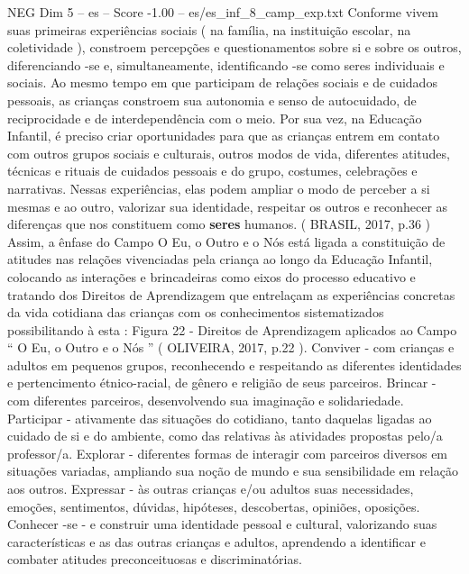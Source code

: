\begin{textsample}{NEG Dim 5 – es – Score -1.00 – es/es\_inf\_8\_camp\_exp.txt}
Conforme vivem suas primeiras experiências sociais ( na família, na instituição escolar, na coletividade ), constroem percepções e questionamentos sobre si e sobre os outros, diferenciando -se e, simultaneamente, identificando -se como seres individuais e sociais.
Ao mesmo tempo em que participam de relações sociais e de cuidados pessoais, as crianças constroem sua autonomia e senso de autocuidado, de reciprocidade e de interdependência com o meio.
Por sua vez, na Educação Infantil, é preciso criar oportunidades para que as crianças entrem em contato com outros grupos sociais e culturais, outros modos de vida, diferentes atitudes, técnicas e rituais de cuidados pessoais e do grupo, costumes, celebrações e narrativas.
Nessas experiências, elas podem ampliar o modo de perceber a si mesmas e ao outro, valorizar sua identidade, respeitar os outros e reconhecer as diferenças que nos constituem como \textbf{seres} humanos. ( BRASIL, 2017, p.36 ) Assim, a ênfase do Campo O Eu, o Outro e o Nós está ligada a constituição de atitudes nas relações vivenciadas pela criança ao longo da Educação Infantil, colocando as interações e brincadeiras como eixos do processo educativo e tratando dos Direitos de Aprendizagem que entrelaçam as experiências concretas da vida cotidiana das crianças com os conhecimentos sistematizados possibilitando à esta : Figura 22 - Direitos de Aprendizagem aplicados ao Campo “ O Eu, o Outro e o Nós ” ( OLIVEIRA, 2017, p.22 ).
Conviver - com crianças e adultos em pequenos grupos, reconhecendo e respeitando as diferentes identidades e pertencimento étnico-racial, de gênero e religião de seus parceiros.
Brincar - com diferentes parceiros, desenvolvendo sua imaginação e solidariedade.
Participar - ativamente das situações do cotidiano, tanto daquelas ligadas ao cuidado de si e do ambiente, como das relativas às atividades propostas pelo/a professor/a.
Explorar - diferentes formas de interagir com parceiros diversos em situações variadas, ampliando sua noção de mundo e sua sensibilidade em relação aos outros.
Expressar - às outras crianças e/ou adultos suas necessidades, emoções, sentimentos, dúvidas, hipóteses, descobertas, opiniões, oposições.
Conhecer -se - e construir uma identidade pessoal e cultural, valorizando suas características e as das outras crianças e adultos, aprendendo a identificar e combater atitudes preconceituosas e discriminatórias.

\end{textsample}
